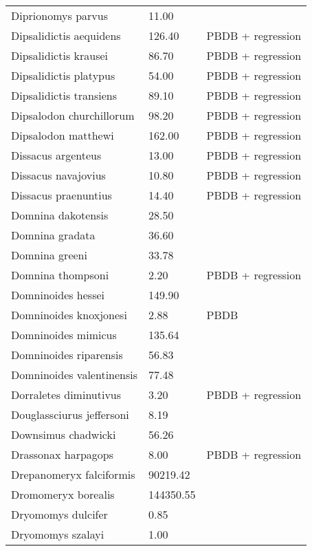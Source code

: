 \begin{longtable}{p{} p{} p{}}
    Diprionomys parvus & 11.00 & \cite{McKenna2011} \\ 
    Dipsalidictis aequidens & 126.40 & PBDB + regression \\ 
    Dipsalidictis krausei & 86.70 & PBDB + regression \\ 
    Dipsalidictis platypus & 54.00 & PBDB + regression \\ 
    Dipsalidictis transiens & 89.10 & PBDB + regression \\ 
    Dipsalodon churchillorum & 98.20 & PBDB + regression \\ 
    Dipsalodon matthewi & 162.00 & PBDB + regression \\ 
    Dissacus argenteus & 13.00 & PBDB + regression \\ 
    Dissacus navajovius & 10.80 & PBDB + regression \\ 
    Dissacus praenuntius & 14.40 & PBDB + regression \\ 
    Domnina dakotensis & 28.50 & \cite{Tomiya2013} \\ 
    Domnina gradata & 36.60 & \cite{Tomiya2013} \\ 
    Domnina greeni & 33.78 & \cite{Tomiya2013} \\ 
    Domnina thompsoni & 2.20 & PBDB + regression \\ 
    Domninoides hessei & 149.90 & \cite{Tomiya2013} \\ 
    Domninoides knoxjonesi & 2.88 & PBDB \\ 
    Domninoides mimicus & 135.64 & \cite{Tomiya2013} \\ 
    Domninoides riparensis & 56.83 & \cite{Tomiya2013} \\ 
    Domninoides valentinensis & 77.48 & \cite{Tomiya2013} \\ 
    Dorraletes diminutivus & 3.20 & PBDB + regression \\ 
    Douglassciurus jeffersoni & 8.19 & \cite{Mihlbacher2006} \\ 
    Downsimus chadwicki & 56.26 & \cite{Tomiya2013} \\ 
    Drassonax harpagops & 8.00 & PBDB + regression \\ 
    Drepanomeryx falciformis & 90219.42 & \cite{Tomiya2013} \\ 
    Dromomeryx borealis & 144350.55 & \cite{Tomiya2013} \\ 
    Dryomomys dulcifer & 0.85 & \cite{Novacek1977} \\ 
    Dryomomys szalayi & 1.00 & \cite{Novacek1977} \\ 

\end{longtable}
